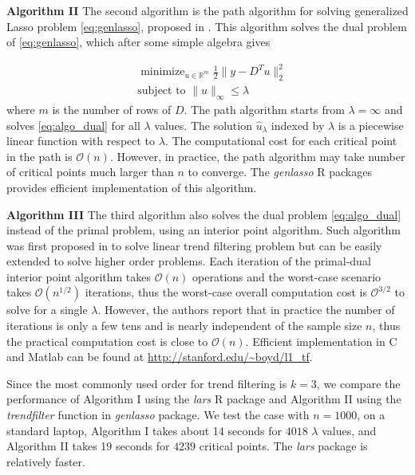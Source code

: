 \documentclass[a4paper]{article}
\newcommand{\RR}{\mathbb{R}}
\renewcommand{\cal}{\mathcal}
\DeclareMathOperator*{\minimize}{minimize}
\begin{document}
\textbf{Algorithm II} The second algorithm is the path algorithm for solving generalized Lasso problem \eqref{eq:genlasso}, proposed in \cite{harchaoui2010multiple,tibshirani2011solution}. This algorithm solves the dual problem of \eqref{eq:genlasso}, which after some simple algebra gives

\begin{equation}
\begin{aligned}
&\minimize_{u\in\RR^m} \frac{1}{2}\|y-D^Tu\|_2^2\\
&\mbox{subject to } \|u\|_\infty \leq \lambda
\label{eq:algo_dual}
\end{aligned}
\end{equation}
where $m$ is the number of rows of $D$. The path algorithm starts from $\lambda = \infty$ and solves \eqref{eq:algo_dual} for all $\lambda$ values. The solution $\hat{u}_\lambda$ indexed by $\lambda$ is a piecewise linear function with respect to $\lambda$. The computational cost for each critical point in the path is $\cal{O}(n)$. However, in practice, the path algorithm may take number of critical points much larger than $n$ to converge. The \textit{genlasso} R packages provides efficient implementation of this algorithm.

\textbf{Algorithm III} The third algorithm also solves the dual problem \eqref{eq:algo_dual} instead of the primal problem, using an interior point algorithm. Such algorithm was first proposed in \cite{kim2009ell_1} to solve linear trend filtering problem but can be easily extended to solve higher order problems. Each iteration of the primal-dual interior point algorithm takes $\cal{O}(n)$ operations and the worst-case scenario takes $\cal{O}(n^{1/2})$ iterations, thus the worst-case overall computation cost is $\cal{O}^{3/2}$ to solve for a single $\lambda$. However, the authors report that in practice the number of iterations is only a few tens and is nearly independent of the sample size $n$, thus the practical computation cost is close to $\cal{O}(n)$. Efficient implementation in C and Matlab can be found at \url{http://stanford.edu/~boyd/l1_tf}. 

Since the most commonly used order for trend filtering is $k = 3$, we compare the performance of Algorithm I using the \textit{lars} R package and Algorithm II using the \textit{trendfilter} function in \textit{genlasso} package. We test the case with $n = 1000$, on a standard laptop, Algorithm I takes about 14 seconds for $4018$ $\lambda$ values, and Algorithm II takes 19 seconds for $4239$ critical points. The \textit{lars} package is relatively faster. 
\end{document}
